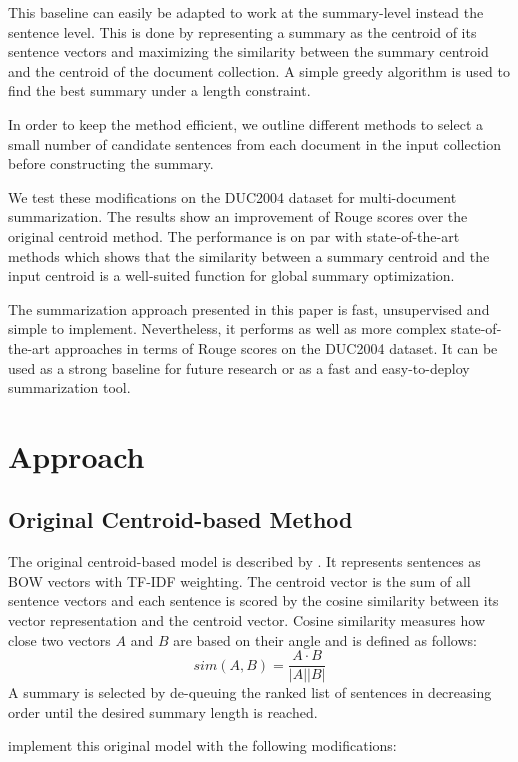 \documentclass[11pt,letterpaper]{article}
\begin{document}
This baseline can easily be adapted to work at the summary-level instead the sentence level. This is done by representing a summary as the centroid of its sentence vectors and maximizing the similarity between the summary centroid and the centroid of the document collection. A simple greedy algorithm is used to find the best summary under a length constraint.

In order to keep the method efficient, we outline different methods to select a small number of candidate sentences from each document in the input collection before constructing the summary.

We test these modifications on the DUC2004 dataset for multi-document summarization. The results show an improvement of Rouge scores over the original centroid method. The performance is on par with state-of-the-art methods which shows that the similarity between a summary centroid and the input centroid is a well-suited function for global summary optimization.

The summarization approach presented in this paper is fast, unsupervised and simple to implement. Nevertheless, it performs as well as more complex state-of-the-art approaches in terms of Rouge scores on the DUC2004 dataset. It can be used as a strong baseline for future research or as a fast and easy-to-deploy summarization tool. 
  
\section{Approach}
\subsection{Original Centroid-based Method}
The original centroid-based model is described by \citet{radev2004centroid}. It represents sentences as BOW vectors with TF-IDF weighting. The centroid vector is the sum of all sentence vectors and each sentence is scored by the cosine similarity between its vector representation and the centroid vector. Cosine similarity measures how close two vectors $A$ and $B$ are based on their angle and is defined as follows:
\begin{equation}
	sim(A, B) = \frac{A \cdot B}{|A||B|}
\end{equation}
A summary is selected by de-queuing the ranked list of sentences in decreasing order until the desired summary length is reached. 

\citet{Rossiello2017CentroidbasedTS} implement this original model with the following modifications:
\end{document}
